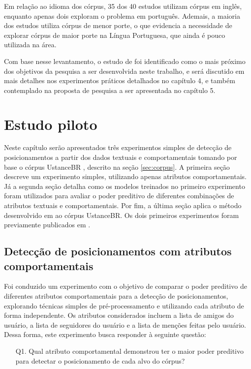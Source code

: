 \documentclass[
	12pt, oneside, a4paper, english, brazil
]{abntex2ppgsi}
\begin{document}
Em relação ao idioma dos córpus, 35 dos 40 estudos utilizam córpus em inglês, enquanto apenas dois exploram o problema em português. Ademais, a maioria dos estudos utiliza córpus de menor porte, o que evidencia a necessidade de explorar córpus de maior porte na Língua Portuguesa, que ainda é pouco utilizada na área.

Com base nesse levantamento, o estudo de  foi identificado como o mais próximo dos objetivos da pesquisa a ser desenvolvida neste trabalho, e será discutido em mais detalhes nos experimentos práticos detalhados no capítulo 4, e também contemplado na proposta de pesquisa a ser apresentada no capítulo 5.


\chapter{Estudo piloto}
\label{sec:experimentos}

Neste capítulo serão apresentados três experimentos simples de detecção de posicionamentos a partir dos dados textuais e comportamentais tomando por base o córpus UstanceBR \cite{ustancebr}, descrito na seção \ref{sec:corpus}. A primeira seção descreve um experimento simples, utilizando apenas atributos comportamentais. Já a segunda seção detalha como os modelos treinados no primeiro experimento foram utilizados para avaliar o poder preditivo de diferentes combinações de atributos textuais e comportamentais. Por fim, a última seção aplica o método desenvolvido em  ao córpus UstanceBR. Os dois primeiros experimentos foram previamente publicados em .

\section{Detecção de posicionamentos com atributos comportamentais}
\label{sec:deteccao-atributos-comportamentais}

Foi conduzido um experimento com o objetivo de comparar o poder preditivo de diferentes atributos comportamentais para a detecção de posicionamentos, explorando técnicas simples de pré-processamento e utilizando cada atributo de forma independente. Os atributos considerados incluem a lista de amigos do usuário, a lista de seguidores do usuário e a lista de menções feitas pelo usuário. Dessa forma, este experimento busca responder à seguinte questão:

\begin{itemize}
    \item [Q1.] Qual atributo comportamental demonstrou ter o maior poder preditivo para detectar o posicionamento de cada alvo do córpus?
\end{itemize}
\end{document}
